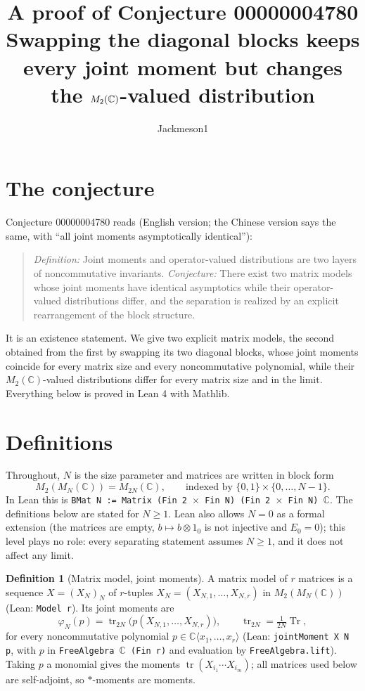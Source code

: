 \documentclass[11pt]{article}
\title{A proof of Conjecture 00000004780\\[2pt]
\large Swapping the diagonal blocks keeps every joint moment but changes the
$M_2(\C)$-valued distribution}
\author{Jackmeson1}
\date{}
\theoremstyle{definition}
\newtheorem{definition}[theorem]{Definition}
\theoremstyle{remark}
\renewcommand{\_}{\oldus\allowbreak}
\newcommand{\tr}{\operatorname{tr}}
\newcommand{\Tr}{\operatorname{Tr}}
\newcommand{\C}{\mathbb{C}}
\begin{document}
\sloppy
\maketitle

\section{The conjecture}

Conjecture 00000004780 reads (English version; the Chinese version says the same, with
``all joint moments asymptotically identical''):

\begin{quote}
\emph{Definition:} Joint moments and operator-valued distributions are two layers of
noncommutative invariants. \emph{Conjecture:} There exist two matrix models whose joint moments
have identical asymptotics while their operator-valued distributions differ, and the separation is
realized by an explicit rearrangement of the block structure.
\end{quote}

It is an existence statement. We give two explicit matrix models, the second obtained from the
first by swapping its two diagonal blocks, whose joint moments coincide for every matrix size and
every noncommutative polynomial, while their $M_2(\C)$-valued distributions differ for every matrix
size and in the limit. Everything below is proved in Lean 4 with Mathlib.

\section{Definitions}

Throughout, $N$ is the size parameter and matrices are written in block form
\[ M_2(M_N(\C)) = M_{2N}(\C), \qquad \text{indexed by } \{0,1\}\times\{0,\dots,N-1\}. \]
In Lean this is \texttt{BMat N := Matrix (Fin 2 $\times$ Fin N) (Fin 2 $\times$ Fin N) $\mathbb C$}.
The definitions below are stated for $N\ge1$. Lean also allows $N=0$ as a formal extension (the
matrices are empty, $b\mapsto b\otimes 1_0$ is not injective and $E_0=0$); this level plays no
role: every separating statement assumes $N\ge1$, and it does not affect any limit.

\begin{definition}[Matrix model, joint moments]
A matrix model of $r$ matrices is a sequence $X=(X_N)_{N}$ of $r$-tuples
$X_N=(X_{N,1},\dots,X_{N,r})$ in $M_2(M_N(\C))$ (Lean: \texttt{Model r}). Its joint moments are
\[ \varphi_N(p) = \tr_{2N}\bigl(p(X_{N,1},\dots,X_{N,r})\bigr),\qquad
\tr_{2N}=\tfrac{1}{2N}\Tr, \]
for every noncommutative polynomial $p\in\C\langle x_1,\dots,x_r\rangle$ (Lean:
\texttt{jointMoment X N p}, with $p$ in \texttt{FreeAlgebra $\mathbb C$ (Fin r)} and evaluation by
\texttt{FreeAlgebra.lift}). Taking $p$ a monomial gives the moments
$\tr(X_{i_1}\cdots X_{i_m})$; all matrices used below are self-adjoint, so $*$-moments are moments.
\end{definition}
\end{document}

